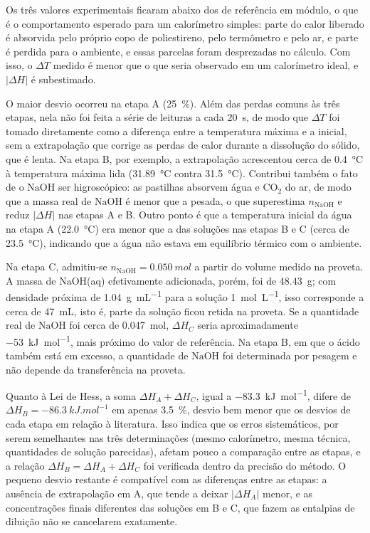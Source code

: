 Os três valores experimentais ficaram abaixo dos de referência em módulo, o que é o comportamento esperado para um calorímetro simples: parte do calor liberado é absorvida pelo próprio copo de poliestireno, pelo termômetro e pelo ar, e parte é perdida para o ambiente, e essas parcelas foram desprezadas no cálculo. Com isso, o $\Delta T$ medido é menor que o que seria observado em um calorímetro ideal, e $|\Delta H|$ é subestimado.

O maior desvio ocorreu na etapa A (\SI{25}{\%}). Além das perdas comuns às três etapas, nela não foi feita a série de leituras a cada \SI{20}{s}, de modo que $\Delta T$ foi tomado diretamente como a diferença entre a temperatura máxima e a inicial, sem a extrapolação que corrige as perdas de calor durante a dissolução do sólido, que é lenta. Na etapa B, por exemplo, a extrapolação acrescentou cerca de \SI{0,4}{\degreeCelsius} à temperatura máxima lida (\SI{31,89}{\degreeCelsius} contra \SI{31,5}{\degreeCelsius}). Contribui também o fato de o $\mathrm{NaOH}$ ser higroscópico: as pastilhas absorvem água e $\mathrm{CO_2}$ do ar, de modo que a massa real de $\mathrm{NaOH}$ é menor que a pesada, o que superestima $n_{\mathrm{NaOH}}$ e reduz $|\Delta H|$ nas etapas A e B. Outro ponto é que a temperatura inicial da água na etapa A (\SI{22,0}{\degreeCelsius}) era menor que a das soluções nas etapas B e C (cerca de \SI{23,5}{\degreeCelsius}), indicando que a água não estava em equilíbrio térmico com o ambiente.

Na etapa C, admitiu-se $n_{\mathrm{NaOH}} = \SI{0,050}{mol}$ a partir do volume medido na proveta. A massa de $\mathrm{NaOH}$(aq) efetivamente adicionada, porém, foi de \SI{48,43}{g}; com densidade próxima de \SI{1,04}{g.mL^{-1}} para a solução \SI{1}{mol.L^{-1}}, isso corresponde a cerca de \SI{47}{mL}, isto é, parte da solução ficou retida na proveta. Se a quantidade real de $\mathrm{NaOH}$ foi cerca de \SI{0,047}{mol}, $\Delta H_C$ seria aproximadamente \SI{-53}{kJ.mol^{-1}}, mais próximo do valor de referência. Na etapa B, em que o ácido também está em excesso, a quantidade de $\mathrm{NaOH}$ foi determinada por pesagem e não depende da transferência na proveta.

Quanto à Lei de Hess, a soma $\Delta H_A + \Delta H_C$, igual a \SI{-83,3}{kJ.mol^{-1}}, difere de $\Delta H_B = \SI{-86,3}{kJ.mol^{-1}}$ em apenas \SI{3,5}{\%}, desvio bem menor que os desvios de cada etapa em relação à literatura. Isso indica que os erros sistemáticos, por serem semelhantes nas três determinações (mesmo calorímetro, mesma técnica, quantidades de solução parecidas), afetam pouco a comparação entre as etapas, e a relação $\Delta H_B = \Delta H_A + \Delta H_C$ foi verificada dentro da precisão do método. O pequeno desvio restante é compatível com as diferenças entre as etapas: a ausência de extrapolação em A, que tende a deixar $|\Delta H_A|$ menor, e as concentrações finais diferentes das soluções em B e C, que fazem as entalpias de diluição não se cancelarem exatamente.

